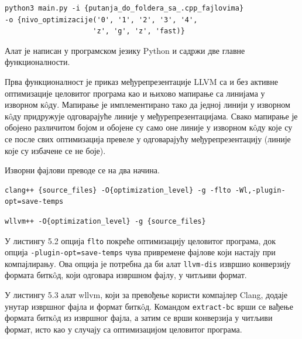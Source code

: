 \documentclass[12pt,oneside]{memoir}
\begin{document}
\begin{lstlisting}[frame=single,caption=Шаблон покретања алата,captionpos=b]
python3 main.py -i {putanja_do_foldera_sa_.cpp_fajlovima}
-o {nivo_optimizacije('0', '1', '2', '3', '4',
                     'z', 'g', 'z', 'fast)}

\end{lstlisting}

Алат је написан у програмском језику Python и садржи две главне функционалности.

Прва функционалност је приказ међурепрезентације LLVM са и без активне оптимизације
целовитог програма као и њихово мапирање са линијама у изворном к\^{o}ду.
Мапирање је имплементирано тако да једној линији у изворном к\^{o}ду придружује
одговарајуће линије у међурепрезентацијама.
Свако мапирање је обојено различитом бојом и обојене су само оне линије у изворном
к\^{o}ду које су се после свих оптимизација превеле у одговарајућу међурепрезентацију
 (линије које су избачене се не боје).
 
Изворни фајлови преводе се на два начина.

\begin{lstlisting}[frame=single, caption=Шаблон превођења изворних фајлова са оптимизацијом целовитог програма, captionpos=b]
clang++ {source_files} -O{optimization_level} -g -flto -Wl,-plugin-opt=save-temps
\end{lstlisting}
 
\begin{lstlisting}[frame=single, caption=Шаблон превођења изворних фајлова без оптимизације целовитог програма, captionpos=b]
wllvm++ -O{optimization_level} -g {source_files}
\end{lstlisting}
 
У листингу 5.2 опција \texttt{flto} покреће оптимизацију целовитог програма,
док опција \texttt{-plugin-opt=save-temps} чува привремене фајлове који настају
при компајлирању.
Ова опција је потребна да би алат \texttt{llvm-dis} извршио конверзију формата битк\^{o}д,
који одговара извршном фајлу, у читљиви формат.

У листингу 5.3 алат wllvm, који за превођење користи компајлер Clang, додаје унутар извршног фајла и формат битк\^{o}д. 
Командом \texttt{extract-bc} врши се вађење формата битк\^{o}д из извршног фајла, а затим се врши конверзија у читљиви формат, исто као у случају са оптимизацијом
целовитог програма.
\end{document}
